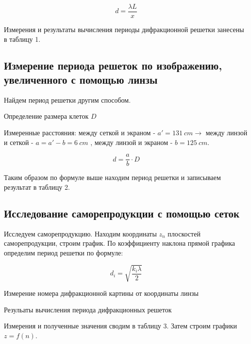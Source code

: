 \[     d = \frac{\lambda L}{x}        \]

Измерения и результаты вычисления периоды дифракционной решетки занесены в таблицу 1.



\subsection{Измерение периода решеток по изображению, увеличенного с помощью линзы}

Найдем период решетки другим способом.
 
\begin{table}[h!]
	\centering
	
	\caption{Определение размера клеток $D$}
	\label{tb3}
\end{table}


Измеренные расстояния: между сеткой и экраном - $a' = 131 \: cm \rightarrow$ между линзой и сеткой -  $a = a' - b = 6 \: cm$ , между линзой и экраном - $ b= 125\:cm$.

\[    d = \frac{a}{b} \cdot D   \]

Таким образом по формуле выше находим период решетки и записываем результат в таблицу 2. 


\subsection{Исследование саморепродукции с помощью сеток}

Исследуем саморепродукцию.
Находим координаты $z_n$ плоскостей саморепродукции, строим график. По коэффициенту наклона прямой графика определим период решетки по формуле:

\begin{equation}
  d_i = \sqrt{\frac{k_i\lambda}{2}}
\end{equation}


\begin{table}[h!]
	\centering
	
	\caption{Измерение номера дифракционной картины от координаты линзы}
	\label{tb1}
\end{table}

\begin{table}[h!]
	\centering
	
	\caption{Резульаты вычисления периода дифракционных решеток}
	\label{tb2}
\end{table}

Измерения и полученные значения сводим в таблицу 3. 
Затем строим графики $z = f(n)$.


